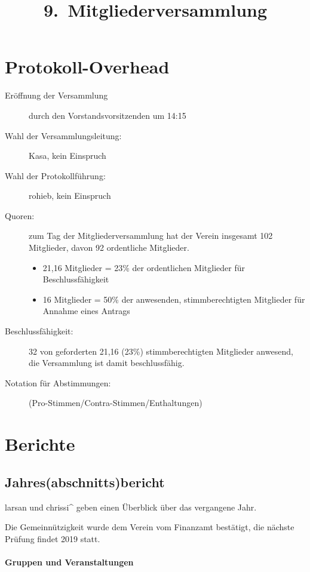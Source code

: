 \documentclass{s0minutes}
\title{9.\, Mitgliederversammlung}
\begin{document}
\maketitle

\section{Protokoll-Overhead}
\begin{description}
  \item[Eröffnung der Versammlung] durch den Vorstandsvorsitzenden um 14:15
  \item[Wahl der Versammlungsleitung:] Kasa, kein Einspruch
  \item[Wahl der Protokollführung:] rohieb, kein Einspruch
  \item[Quoren:] zum Tag der Mitgliederversammlung hat der Verein insgesamt 102
    Mitglieder, davon 92 ordentliche Mitglieder.
    \begin{itemize}
      \item 21{,}16 Mitglieder = 23\% der ordentlichen Mitglieder für
        Beschlussfähigkeit
      \item 16 Mitglieder = 50\% der anwesenden, stimmberechtigten Mitglieder
        für Annahme eines Antrags
    \end{itemize}
  \item[Beschlussfähigkeit:] 32 von geforderten 21{,}16 (23\%) stimmberechtigten
    Mitglieder anwesend, die Versammlung ist damit beschlussfähig.
  \item[Notation für Abstimmungen:] (Pro-Stimmen/Contra-Stimmen/Enthaltungen)
\end{description}

\section{Berichte}

\subsection{Jahres(abschnitts)bericht}

larsan und chrissi\^{} geben einen Überblick über das vergangene Jahr.

Die Gemeinnützigkeit wurde dem Verein vom Finanzamt bestätigt, die nächste Prüfung findet 2019 statt.

\paragraph{Gruppen und Veranstaltungen}
\end{document}
